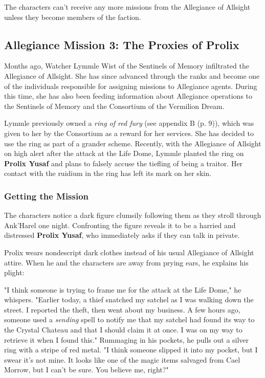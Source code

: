 \documentclass[letterpaper, 11pt, bg=full, twocolumn]{dndbook}
\begin{document}
The characters can't receive any more missions from the Allegiance of Allsight unless they become members of the faction.

\subsection{Allegiance Mission 3: The Proxies of Prolix}

Months ago, Watcher Lymmle Wist of the Sentinels of Memory infiltrated the Allegiance of Allsight. She has since advanced through the ranks and become one of the individuals responsible for assigning missions to Allegiance agents. During this time, she has also been feeding information about Allegiance operations to the Sentinels of Memory and the Consortium of the Vermilion Dream.

Lymmle previously owned a \textit{ring of red fury} (see appendix B (p. 9)), which was given to her by the Consortium as a reward for her services. She has decided to use the ring as part of a grander scheme. Recently, with the Allegiance of Allsight on high alert after the attack at the Life Dome, Lymmle planted the ring on \textbf{Prolix Yusaf} and plans to falsely accuse the tiefling of being a traitor. Her contact with the ruidium in the ring has left its mark on her skin.

\subsubsection{Getting the Mission}

The characters notice a dark figure clumsily following them as they stroll through Ank'Harel one night. Confronting the figure reveals it to be a harried and distressed \textbf{Prolix Yusaf}, who immediately asks if they can talk in private.

Prolix wears nondescript dark clothes instead of his usual Allegiance of Allsight attire. When he and the characters are away from prying ears, he explains his plight:

\begin{DndReadAloud}
"I think someone is trying to frame me for the attack at the Life Dome," he whispers.
"Earlier today, a thief snatched my satchel as I was walking down the street. I reported the theft, then went about my business. A few hours ago, someone used a \textit{sending} spell to notify me that my satchel had found its way to the Crystal Chateau and that I should claim it at once. I was on my way to retrieve it when I found this."
Rummaging in his pockets, he pulls out a silver ring with a stripe of red metal. "I think someone slipped it into my pocket, but I swear it's not mine. It looks like one of the magic items salvaged from Cael Morrow, but I can't be sure. You believe me, right?"
\end{DndReadAloud}
\end{document}
